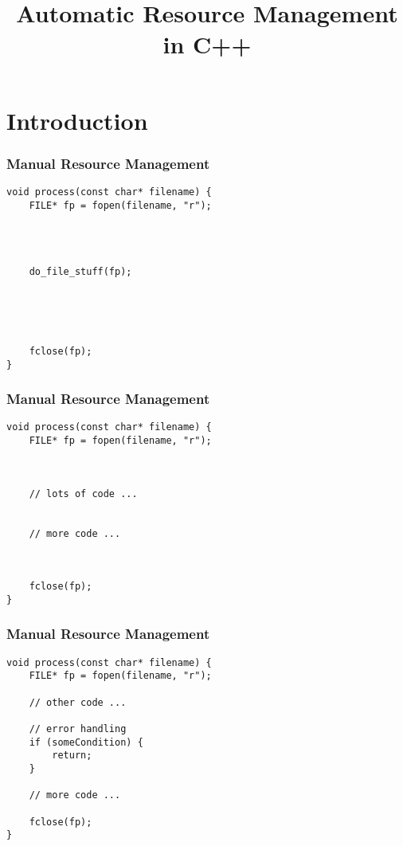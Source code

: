 


\title{Automatic Resource Management in C++}





\frame{\titlepage}

\frame{\tableofcontents}

\section{Introduction}
\frame{\sectionpage}

\begin{frame}[fragile]
    \frametitle{Manual Resource Management}
    \begin{lstlisting}[title=See anything wrong?]
void process(const char* filename) {
    FILE* fp = fopen(filename, "r");




    do_file_stuff(fp);





    fclose(fp);
}
    \end{lstlisting}
\end{frame}

\begin{frame}[fragile]
    \frametitle{Manual Resource Management}
    \begin{lstlisting}[title=See anything wrong?]
void process(const char* filename) {
    FILE* fp = fopen(filename, "r");



    // lots of code ...


    // more code ...



    fclose(fp);
}
    \end{lstlisting}
\end{frame}

\begin{frame}[fragile]
    \frametitle{Manual Resource Management}
    \begin{lstlisting}[title=Forgetting to close!]
void process(const char* filename) {
    FILE* fp = fopen(filename, "r");

    // other code ...

    // error handling
    if (someCondition) {
        return;
    }

    // more code ...

    fclose(fp);
}
    \end{lstlisting}
\end{frame}

